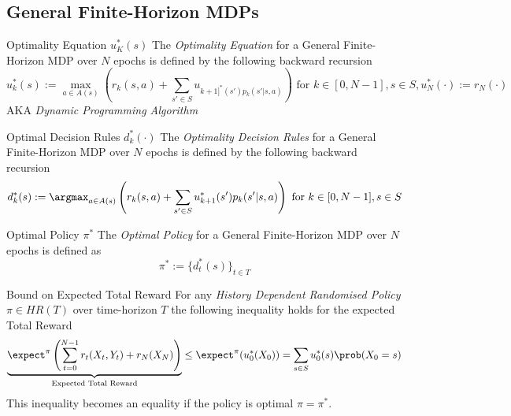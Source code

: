 \documentclass[11pt,a4paper]{article}
\begin{document}
\subsection*{General Finite-Horizon MDPs}

  \begin{definition}{Optimality Equation $u_K^*(s)$}
    The \textit{Optimality Equation} for a General Finite-Horizon MDP over $N$ epochs is defined by the following backward recursion
    \[ u_k^*(s):=\max_{a\in A(s)}\left(r_k(s,a)+\sum_{s'\in S}u_{k+1]^*(s')p_k(s'|s,a)}\right)\text{ for }k\in[0,N-1],s\in S,u_N^*(\cdot):=r_N(\cdot) \]
    AKA \textit{Dynamic Programming Algorithm}
  \end{definition}

  \begin{definition}{Optimal Decision Rules $d_k^*(\cdot)$}
    The \textit{Optimality Decision Rules} for a General Finite-Horizon MDP over $N$ epochs is defined by the following backward recursion
    \[ d_k^*(s):=\argmax_{a\in A(s)}\left(r_k(s,a)+\sum_{s'\in S}u_{k+1}^*(s')p_k(s'|s,a)\right)\text{ for }k\in[0,N-1],s\in S \]
  \end{definition}

  \begin{definition}{Optimal Policy $\pi^*$}
    The \textit{Optimal Policy} for a General Finite-Horizon MDP over $N$ epochs is defined as
    \[ \pi^*:=\{d_t^*(s)\}_{t\in T} \]
  \end{definition}

  \begin{theorem}{Bound on Expected Total Reward}
    For any \textit{History Dependent Randomised Policy} $\pi\in HR(T)$ over time-horizon $T$ the following inequality holds for the expected Total Reward
    \[ \underbrace{\expect^\pi\left(\sum_{t=0}^{N-1}r_t(X_t,Y_t)+r_N(X_N)\right)}_\text{Expected Total Reward}\leq\expect^\pi(u_0^*(X_0))=\sum_{s\in S}u_0^*(s)\prob(X_0=s) \]
    This inequality becomes an equality if the policy is optimal $\pi=\pi^*$.
  \end{theorem}
\end{document}
